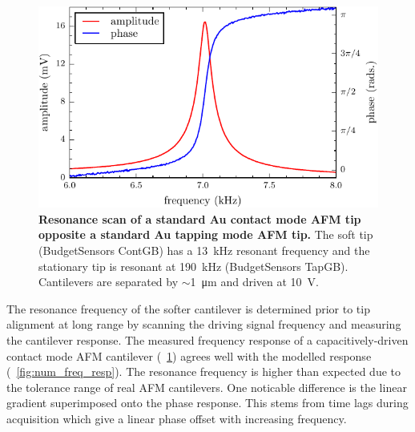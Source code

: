 \documentclass{article}
\begin{document}
\begin{figure}[bt]
\centering
\includegraphics{figures/exp_resonance_scan}
\caption[Resonance scan of a standard Au contact mode AFM tip opposite a standard Au tapping mode AFM tip]{\textbf{Resonance scan of a standard Au contact mode AFM tip opposite a standard Au tapping mode AFM tip.} The soft tip (BudgetSensors ContGB) has a \SI{13}{kHz} resonant frequency and the stationary tip is resonant at \SI{190}{kHz} (BudgetSensors TapGB). Cantilevers are separated by $\sim$\SI{1}{\micro\metre} and driven at \SI{10}{V}.}
\label{fig:exp_freq_resp}
\end{figure}

The resonance frequency of the softer cantilever is determined prior to tip alignment at long range by scanning the driving signal frequency and measuring the cantilever response. The measured frequency response of a capacitively-driven contact mode AFM cantilever (\figurename~\ref{fig:exp_freq_resp}) agrees well with the modelled response (\figurename~\ref{fig:num_freq_resp}). The resonance frequency is higher than expected due to the tolerance range of real AFM cantilevers. One noticable difference is the linear gradient superimposed onto the phase response. This stems from time lags during acquisition which give a linear phase offset with increasing frequency. %
\end{document}
